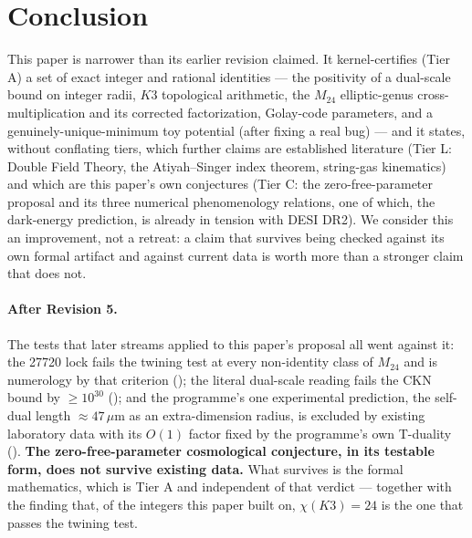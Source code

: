 \documentclass[11pt,a4paper]{article}
\theoremstyle{remark}
\begin{document}
\section{Conclusion}
\label{sec:conclusion}

This paper is narrower than its earlier revision claimed. It kernel-certifies (Tier A) a set of
exact integer and rational identities --- the positivity of a dual-scale bound on integer radii, $K3$
topological arithmetic, the $M_{24}$ elliptic-genus cross-multiplication and its corrected
factorization, Golay-code parameters, and a genuinely-unique-minimum toy potential (after fixing a
real bug) --- and it states, without conflating tiers, which further claims are established
literature (Tier L: Double Field Theory, the Atiyah--Singer index theorem, string-gas kinematics) and
which are this paper's own conjectures (Tier C: the zero-free-parameter proposal and its three
numerical phenomenology relations, one of which, the dark-energy prediction, is already in tension
with DESI DR2). We consider this an improvement, not a retreat: a claim that survives being checked
against its own formal artifact and against current data is worth more than a stronger claim that
does not.

\paragraph{After Revision 5.} The tests that later streams applied to this paper's proposal all went
against it: the 27720 lock fails the twining test at every non-identity class of $M_{24}$ and is
numerology by that criterion (); the literal dual-scale reading fails the CKN
bound by $\ge10^{30}$ (); and the programme's one experimental prediction, the
self-dual length $\approx47\,\mu$m as an extra-dimension radius, is excluded by existing laboratory data
with its $O(1)$ factor fixed by the programme's own T-duality (). \textbf{The
zero-free-parameter cosmological conjecture, in its testable form, does not survive existing data.}
What survives is the formal mathematics, which is Tier A and independent of that verdict --- together
with the finding that, of the integers this paper built on, $\chi(K3)=24$ is the one that passes the
twining test.

\appendix
\end{document}

